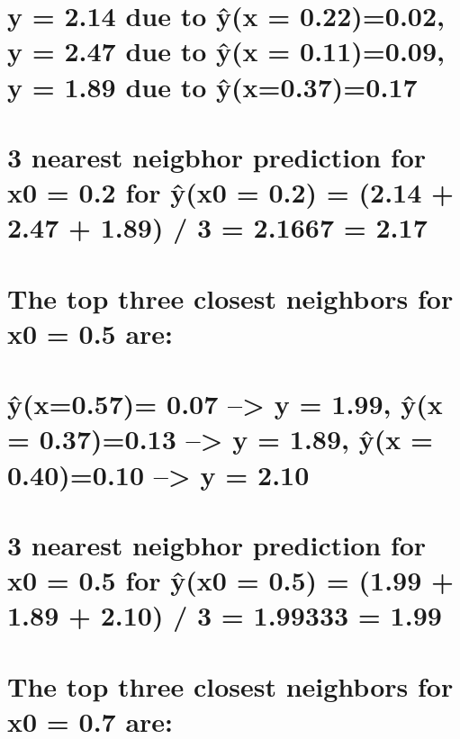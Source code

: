 \documentclass[
  letterpaper,
  DIV=11,
  numbers=noendperiod]{scrreprt}
\begin{document}
{

\chapter{y = 2.14 due to ŷ(x = 0.22)=0.02, y = 2.47 due to ŷ(x =
0.11)=0.09, y = 1.89 due to
ŷ(x=0.37)=0.17}\label{y-2.14-due-to-yx-0.220.02-y-2.47-due-to-yx-0.110.09-y-1.89-due-to-yx0.370.17}


\chapter{3 nearest neigbhor prediction for x0 = 0.2 for ŷ(x0 = 0.2) =
(2.14 + 2.47 + 1.89) / 3 = 2.1667 =
2.17}\label{nearest-neigbhor-prediction-for-x0-0.2-for-yx0-0.2-2.14-2.47-1.89-3-2.1667-2.17}


\chapter{The top three closest neighbors for x0 = 0.5
are:}\label{the-top-three-closest-neighbors-for-x0-0.5-are}


\chapter{ŷ(x=0.57)= 0.07 --\textgreater{} y = 1.99, ŷ(x = 0.37)=0.13
--\textgreater{} y = 1.89, ŷ(x = 0.40)=0.10 --\textgreater{} y =
2.10}\label{yx0.57-0.07-y-1.99-yx-0.370.13-y-1.89-yx-0.400.10-y-2.10}


\chapter{3 nearest neigbhor prediction for x0 = 0.5 for ŷ(x0 = 0.5) =
(1.99 + 1.89 + 2.10) / 3 = 1.99333 =
1.99}\label{nearest-neigbhor-prediction-for-x0-0.5-for-yx0-0.5-1.99-1.89-2.10-3-1.99333-1.99}


\chapter{The top three closest neighbors for x0 = 0.7
are:}\label{the-top-three-closest-neighbors-for-x0-0.7-are}

}
\end{document}
